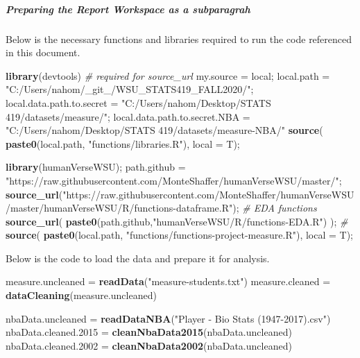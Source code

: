 \documentclass[]{article}
\newenvironment{Shaded}{\begin{snugshade}}{\end{snugshade}}
\newcommand{\CommentTok}[1]{\textcolor[rgb]{0.56,0.35,0.01}{\textit{#1}}}
\newcommand{\DataTypeTok}[1]{\textcolor[rgb]{0.13,0.29,0.53}{#1}}
\newcommand{\FloatTok}[1]{\textcolor[rgb]{0.00,0.00,0.81}{#1}}
\newcommand{\KeywordTok}[1]{\textcolor[rgb]{0.13,0.29,0.53}{\textbf{#1}}}
\newcommand{\NormalTok}[1]{#1}
\newcommand{\StringTok}[1]{\textcolor[rgb]{0.31,0.60,0.02}{#1}}
\begin{document}
\subparagraph{Preparing the Report Workspace as a subparagrah}
\label{sec:appendix-setup4}

Below is the necessary functions and libraries required to run the code
referenced in this document.

\begin{Shaded}
\begin{Highlighting}[]
\KeywordTok{library}\NormalTok{(devtools) }\CommentTok{\# required for source\_url}
\NormalTok{my.source =}\StringTok{ \textquotesingle{}local\textquotesingle{}}\NormalTok{;}
\NormalTok{local.path =}\StringTok{ "C:/Users/nahom/\_git\_/WSU\_STATS419\_FALL2020/"}\NormalTok{;}
\NormalTok{local.data.path.to.secret =}\StringTok{ "C:/Users/nahom/Desktop/STATS 419/datasets/measure/"}\NormalTok{;}
\NormalTok{local.data.path.to.secret.NBA =}\StringTok{ "C:/Users/nahom/Desktop/STATS 419/datasets/measure{-}NBA/"}
\KeywordTok{source}\NormalTok{( }\KeywordTok{paste0}\NormalTok{(local.path, }\StringTok{"functions/libraries.R"}\NormalTok{), }\DataTypeTok{local =}\NormalTok{ T);}

\KeywordTok{library}\NormalTok{(humanVerseWSU);}
\NormalTok{path.github =}\StringTok{ "https://raw.githubusercontent.com/MonteShaffer/humanVerseWSU/master/"}\NormalTok{;}
\KeywordTok{source\_url}\NormalTok{(}\StringTok{"https://raw.githubusercontent.com/MonteShaffer/humanVerseWSU/master/humanVerseWSU/R/functions{-}dataframe.R"}\NormalTok{);}
\CommentTok{\# EDA functions}
\KeywordTok{source\_url}\NormalTok{( }\KeywordTok{paste0}\NormalTok{(path.github,}\StringTok{"humanVerseWSU/R/functions{-}EDA.R"}\NormalTok{) );  }\CommentTok{\#  }
\KeywordTok{source}\NormalTok{( }\KeywordTok{paste0}\NormalTok{(local.path, }\StringTok{"functions/functions{-}project{-}measure.R"}\NormalTok{), }\DataTypeTok{local =}\NormalTok{ T);}
\end{Highlighting}
\end{Shaded}

Below is the code to load the data and prepare it for analysis.

\begin{Shaded}
\begin{Highlighting}[]
\NormalTok{measure.uncleaned =}\StringTok{ }\KeywordTok{readData}\NormalTok{(}\StringTok{"measure{-}students.txt"}\NormalTok{)}
\NormalTok{measure.cleaned =}\StringTok{ }\KeywordTok{dataCleaning}\NormalTok{(measure.uncleaned)}

\NormalTok{nbaData.uncleaned =}\StringTok{ }\KeywordTok{readDataNBA}\NormalTok{(}\StringTok{"Player {-} Bio Stats (1947{-}2017).csv"}\NormalTok{)}
\NormalTok{nbaData.cleaned}\FloatTok{.2015}\NormalTok{ =}\StringTok{ }\KeywordTok{cleanNbaData2015}\NormalTok{(nbaData.uncleaned)}
\NormalTok{nbaData.cleaned}\FloatTok{.2002}\NormalTok{ =}\StringTok{ }\KeywordTok{cleanNbaData2002}\NormalTok{(nbaData.uncleaned)}
\end{Highlighting}
\end{Shaded}
\end{document}
